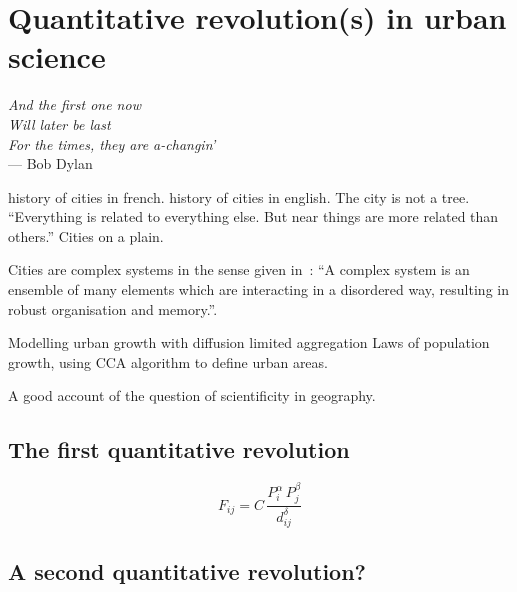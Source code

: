 

\chapter{Quantitative revolution(s) in urban science}
\label{chap:quantitative_revolutions}

\begin{flushright}{\slshape    
And the first one now\\
Will later be last\\
For the times, they are a-changin'} \\ \medskip
--- Bob Dylan 
\end{flushright}


\bigskip


\cite{Bairoch:1985} history of cities in french.
\cite{Mumford:1961} history of cities in english.
\cite{Alexander:1964} The city is not a tree.
\cite{Tobler:1970} ``Everything is related to everything else. But near things
are more related than others.''
\cite{Glass:1971} Cities on a plain.


Cities are complex systems in the sense given in~\cite{Ladyman:2013}: ``A complex system is an ensemble of many elements
which are interacting in a disordered way, resulting in robust organisation and
memory.''.


\cite{Makse:1995} Modelling urban growth with diffusion limited aggregation
\cite{Rozenfeld:2008} Laws of population growth, using CCA algorithm to define
urban areas.

\cite{Sanders:2011} A good account of the question of scientificity in
geography.

\section{The first quantitative revolution}
\label{sec:the_first_quantitative_revolution}


\begin{equation}
    F_{ij} = C\, \frac{P_i^\alpha\,P_j^\beta}{d_{ij}^\delta}
\end{equation}

\section{A second quantitative revolution?}
\label{sec:a_second_quantitative_revolution_}

